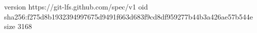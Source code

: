 version https://git-lfs.github.com/spec/v1
oid sha256:f275d8b1932394997675d9491f663d683f9cd8df959277b44b3a426ae57b544e
size 3168
